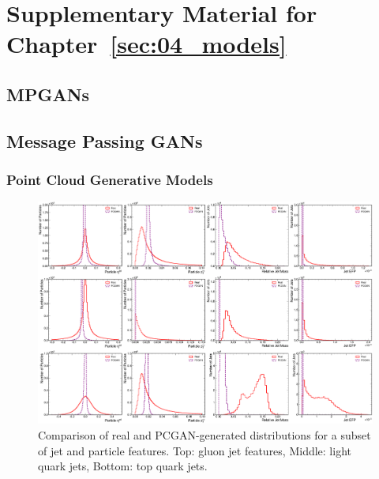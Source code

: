 \chapter{Supplementary Material for Chapter~\ref{sec:04_models}}
\label{app:04_models}

\ifdefined\HCode
    \section{MPGANs}
\else
    \section{Message Passing GANs}
\fi

\label{app:04_mpgan}

\subsection{Point Cloud Generative Models}
\label{app:04_mpgan_pcgen}

\begin{figure}[htpb!]
    \centering
    \centerline{\includegraphics[width=\textwidth]{figures/04-ML4Sim/mpgan/results/pcgan_feature_distributions.pdf}}
    \caption{Comparison of real and PCGAN-generated distributions for a subset of jet and particle features. Top: gluon jet features, Middle: light quark jets, Bottom: top quark jets.}
    \label{fig:04_mpgan_pcgan_results}
\end{figure}

